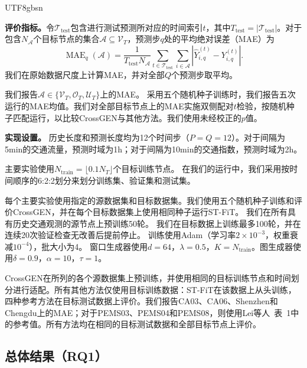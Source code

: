 \documentclass[runningheads,a4paper]{llncs}
\begin{document}
\begin{CJK*}{UTF8}{gbsn}
\begingroup
\DeclareRobustCommand{\evaluationmetrics}{%
\begin{samepage}
  \textbf{评价指标。}令$\mathcal T_{\mathrm{test}}$包含进行测试预测所对应的时间索引$t$，其中$T_{\mathrm{test}}=|\mathcal T_{\mathrm{test}}|$。对于包含$N_{\mathcal A}$个目标节点的集合$\mathcal A\subseteq\mathcal V_T$，预测步$q$处的平均绝对误差（MAE）为
\[
  \operatorname{MAE}_{q}(\mathcal A)
  = \frac{1}{T_{\mathrm{test}}N_{\mathcal A}}
    \sum_{t\in\mathcal T_{\mathrm{test}}}\sum_{i\in\mathcal A}
    \left|\widehat Y_{i,q}^{(t)}-Y_{i,q}^{(t)}\right|.
\]
我们在原始数据尺度上计算MAE，并对全部$Q$个预测步取平均。
\end{samepage}
我们报告$\mathcal A\in\{\mathcal V_T,\mathcal O_T,\mathcal U_T\}$上的MAE。
采用五个随机种子训练时，我们报告五次运行的MAE均值。我们对全部目标节点上的MAE实施双侧配对$t$检验，按随机种子匹配运行，以比较CrossGEN与其他方法。我们使用未经校正的$p$值。
}
\noindent\evaluationmetrics
\endgroup

\noindent\textbf{实现设置。}
历史长度和预测长度均为12个时间步（$P=Q=12$）。对于间隔为5min的交通流量，预测时域为1h；对于间隔为10min的交通指数，预测时域为2h。

主要实验使用$N_{\mathrm{train}}=\lfloor 0.1 N_T\rfloor$个目标训练节点。
在我们的运行中，我们采用按时间顺序的6:2:2划分来划分训练集、验证集和测试集。





每个主要实验使用指定的源数据集和目标数据集。我们使用五个随机种子训练和评价CrossGEN，并在每个目标数据集上使用相同种子运行ST-FiT。
我们在所有具有历史交通观测的源节点上预训练50轮。
我们在目标数据上训练最多100轮，并在连续20次验证检查无改善后提前停止。
训练使用Adam（学习率$2\times10^{-3}$，权重衰减$10^{-4}$），批大小为4。
窗口生成器使用$d=64$，$\lambda=0.5$，$K=N_{\mathrm{train}}$。图生成器使用$\delta=0.9$，$\alpha=10$，$\tau=1$。





CrossGEN在所列的各个源数据集上预训练，并使用相同的目标训练节点和时间划分进行适配。所有其他方法仅使用目标训练数据：ST-FiT在该数据上从头训练，四种参考方法在目标测试数据上评价。我们报告CA03、CA06、Shenzhen和Chengdu上的MAE；对于PEMS03、PEMS04和PEMS08，则使用Lei等人~\cite{stfit}表~1中的参考值。所有方法均在相同的目标测试数据和全部目标节点上评价。

\subsection{总体结果（RQ1）}
\label{sec:overall-results}










\end{CJK*}
\end{document}
